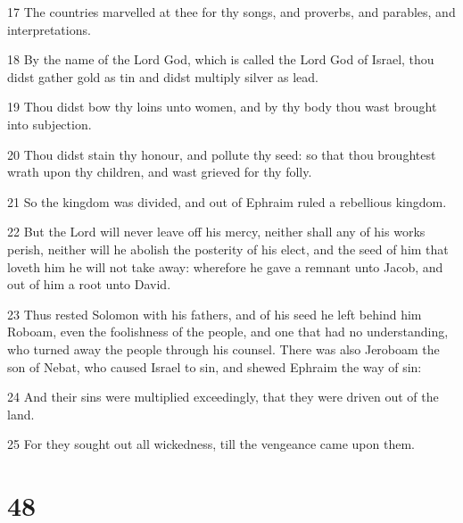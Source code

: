 \par 17 The countries marvelled at thee for thy songs, and proverbs, and parables, and interpretations.
\par 18 By the name of the Lord God, which is called the Lord God of Israel, thou didst gather gold as tin and didst multiply silver as lead.
\par 19 Thou didst bow thy loins unto women, and by thy body thou wast brought into subjection.
\par 20 Thou didst stain thy honour, and pollute thy seed: so that thou broughtest wrath upon thy children, and wast grieved for thy folly.
\par 21 So the kingdom was divided, and out of Ephraim ruled a rebellious kingdom.
\par 22 But the Lord will never leave off his mercy, neither shall any of his works perish, neither will he abolish the posterity of his elect, and the seed of him that loveth him he will not take away: wherefore he gave a remnant unto Jacob, and out of him a root unto David.
\par 23 Thus rested Solomon with his fathers, and of his seed he left behind him Roboam, even the foolishness of the people, and one that had no understanding, who turned away the people through his counsel. There was also Jeroboam the son of Nebat, who caused Israel to sin, and shewed Ephraim the way of sin:
\par 24 And their sins were multiplied exceedingly, that they were driven out of the land.
\par 25 For they sought out all wickedness, till the vengeance came upon them.

\chapter{48}

